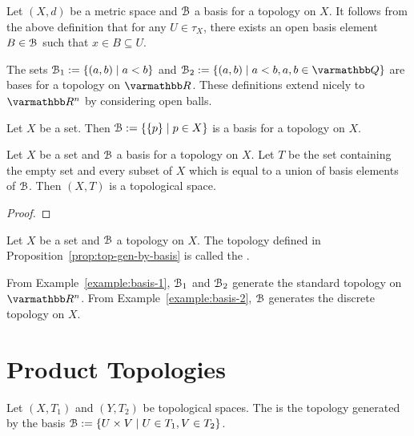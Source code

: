 \begin{remark}
    Let $(X,d)$ be a metric space and $\mathcal{B}$ a basis for a topology on $X$. It follows from the above definition that for any $U \in \tau_X$, there exists an open basis element $B \in \mathcal{B}$ such that $x \in B \subseteq U$.
\end{remark}

\begin{example}\label{example:basis-1}
    The sets $\mathcal{B}_1 := \{(a,b) \mid a<b\}$ and $\cB_2 := \{(a,b) \mid a < b, a,b \in \bfQ\}$ are bases for a topology on $\bfR$. These definitions extend nicely to $\bfR^n$ by considering open balls.
\end{example}

\begin{example}\label{example:basis-2}
    Let $X$ be a set. Then $\mathcal{B} := \{\{p\} \mid p \in X\}$ is a basis for a topology on $X$.
\end{example}

\begin{proposition}\label{prop:top-gen-by-basis}
    Let $X$ be a set and $\mathcal{B}$ a basis for a topology on $X$. Let $T$ be the set containing the empty set and every subset of $X$ which is equal to a union of basis elements of $\mathcal{B}$. Then $(X,T)$ is a topological space.
\end{proposition}
    {\color{red} \begin{proof}
        
    \end{proof}}

\begin{definition}
    Let $X$ be a set and $\mathcal{B}$ a topology on $X$. The topology defined in Proposition~\ref{prop:top-gen-by-basis} is called the .
\end{definition}

\begin{example}
    From Example~\ref{example:basis-1}, $\mathcal{B}_1$ and $\mathcal{B}_2$ generate the standard topology on $\bfR^n$. From Example~\ref{example:basis-2}, $\mathcal{B}$ generates the discrete topology on $X$.
\end{example}

\section{Product Topologies}

\begin{definition}
    Let $(X,T_1)$ and $(Y,T_2)$ be topological spaces. The  is the topology generated by the basis $\mathcal{B} := \{U \times V \mid U \in T_1, V \in T_2\}$.
\end{definition}

